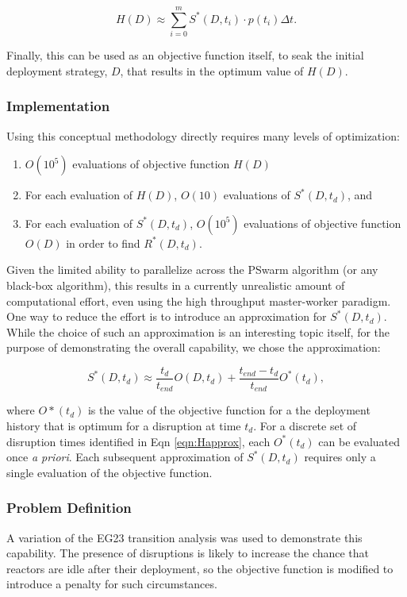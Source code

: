 $$H(D) \approx \sum_{i=0}^m S^*(D,t_i) \cdot p(t_i) \Delta t.$$ \label{eqn:Happrox}


Finally, this can be used as an objective function itself, to seak the initial
deployment strategy, $D$, that results in the optimum value of $H(D)$.


\subsubsection{Implementation}

Using this conceptual methodology directly requires many levels of optimization:
\begin{enumerate}
\item $O(10^5)$ evaluations of objective function $H(D)$
\item For each evaluation of $H(D)$, $O(10)$ evaluations of $S^*(D,t_d)$, and
\item For each evaluation of $S^*(D,t_d)$, $O(10^5)$ evaluations of objective
  function $O(D)$ in order to find $R^*(D,t_d)$.
\end{enumerate}

Given the limited ability to parallelize across the PSwarm algorithm (or any
black-box algorithm), this results in a currently unrealistic amount of
computational effort, even using the high throughput master-worker paradigm.
One way to reduce the effort is to introduce an approximation for
$S^*(D,t_d)$.  While the choice of such an approximation is an interesting
topic itself, for the purpose of demonstrating the overall capability, we
chose the approximation:

$$S^*(D,t_d) \approx \frac{t_d}{t_{end}} O(D,t_d) + \frac{t_{end}-t_d}{t_{end}} O^*(t_d),$$

\noindent where $O*(t_d)$ is the value of the objective function for a the
deployment history that is optimum for a disruption at time $t_d$.  For a
discrete set of disruption times identified in Eqn \ref{eqn:Happrox}, each
$O^*(t_d)$ can be evaluated once \textit{a priori}.  Each subsequent
approximation of $S^*(D,t_d)$ requires only a single evaluation of the
objective function.


\subsubsection{Problem Definition}

A variation of the EG23 transition analysis was used to demonstrate this
capability.  The presence of disruptions is likely to increase the chance that
reactors are idle after their deployment, so the objective function is
modified to introduce a penalty for such circumstances.

